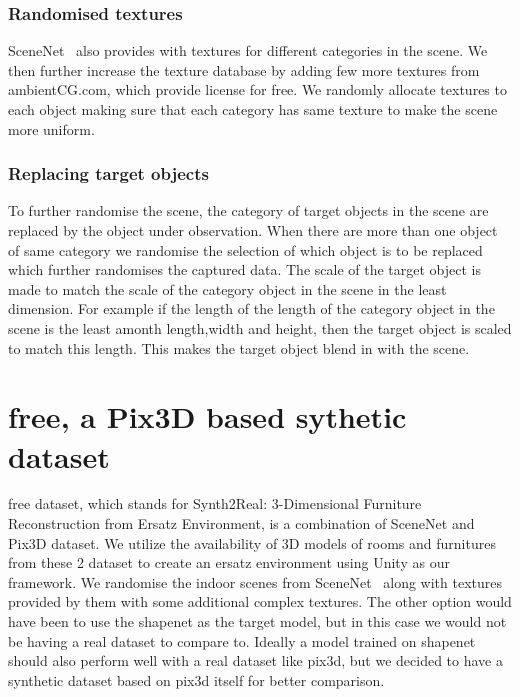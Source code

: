 \subsubsection{Randomised textures}
SceneNet~\cite{McCormac:etal:ICCV2017} also provides with textures for different categories in the scene.
We then further increase the texture database by adding few more textures from ambientCG.com, which provide license for free.
We randomly allocate textures to each object making sure that each category has same texture to make the scene more uniform.

\subsubsection{Replacing target objects}
To further randomise the scene, the category of target objects in the scene are replaced by the object under observation.
When there are more than one object of same category we randomise the selection of which object is to be replaced which further randomises the captured data.
The scale of the target object is made to match the scale of the category object in the scene in the least dimension.
For example if the length of the length of the category object in the scene is the least amonth length,width and height, then the target object is scaled to match this length.
This makes the target object blend in with the scene.

\section{\gls{free}, a Pix3D based sythetic dataset}\label{sec:s2r:3d-free-a-pix3d-based-sythetic-dataset}

\gls{free} dataset, which stands for Synth2Real: 3-Dimensional Furniture Reconstruction from Ersatz Environment, is a combination of SceneNet and Pix3D dataset.
We utilize the availability of 3D models of rooms and furnitures from these 2 dataset to create an ersatz environment using Unity as our framework.
We randomise the indoor scenes from SceneNet~\cite{McCormac:etal:ICCV2017} along with textures provided by them with some additional complex textures.
The other option would have been to use the shapenet as the target model, but in this case we would not be having a real dataset to compare to.
Ideally a model trained on shapenet should also perform well with a real dataset like pix3d, but we decided to have a synthetic dataset based on pix3d itself for better comparison.

